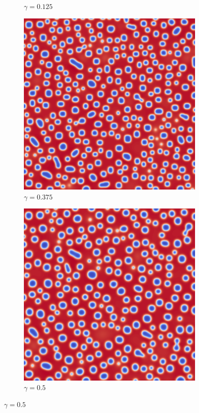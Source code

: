 \documentclass[12pt, letterpaper]{article}
\begin{document}
\begin{figure}[h]
\begin{subfigure}[b]{.23\linewidth}
    \caption{$\gamma=0.125$}
  \end{subfigure}
  \begin{subfigure}[b]{.23\linewidth}
    \includegraphics[width=\linewidth]{CahnHilliard/ch375.png}
    \caption{$\gamma=0.375$}
  \end{subfigure}
  \begin{subfigure}[b]{.23\linewidth}
    \includegraphics[width=\linewidth]{CahnHilliard/ch5.png}
    \caption{$\gamma=0.5$}
  \end{subfigure}
\end{figure}
\end{document}
